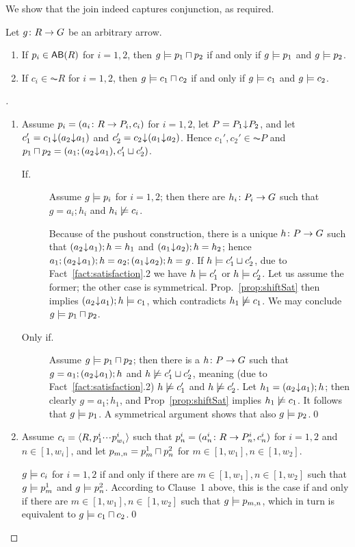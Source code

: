 We show that the join indeed captures conjunction, as required.
%
\begin{proposition}\label{prop:join} Let $g\colon R\rightarrow G$ be an arbitrary arrow.
\begin{enumerate}[defsep]
\item If $p_i\in \AB R$ for $i=1,2$, then $g\models p_1\sqcap p_2$ if and only if $g\models p_1$ and $g\models p_2$.

\item If $c_i\in \AC R$ for $i=1,2$, then $g\models c_1\sqcap c_2$ if and only if $g\models c_1$ and $g\models c_2$.
\end{enumerate}
\end{proposition}
%
\begin{proof}[]
\begin{enumerate}[defsep]
\item Assume $p_i=(a_i\colon R\rightarrow P_i,c_i)$ for $i=1,2$, let $P=P_1{\mskip1mu\downarrow\mskip1mu} P_2$, and let $c_1'={c_1}{\mskip1mu\downarrow\mskip1mu}{(a_2{\mskip1mu\downarrow\mskip1mu} a_1)}$ and $c_2'={c_2}{\mskip1mu\downarrow\mskip1mu}{(a_1{\mskip1mu\downarrow\mskip1mu} a_2)}$. Hence $c_1',c_2'\in \AC P$ and $p_1\sqcap p_2=(a_1;(a_2{\mskip1mu\downarrow\mskip1mu} a_1),c_1'\sqcup c_2')$.

\begin{description}
\item[If.] Assume $g\models p_i$ for $i=1,2$; then there are $h_i\colon P_i\rightarrow G$ such that $g=a_i;h_i$ and $h_i\not\models c_i$.
 
Because of the pushout construction, there is a unique $h\colon P\rightarrow G$ such that $(a_2{\mskip1mu\downarrow\mskip1mu} a_1);h=h_1$ and $(a_1{\mskip1mu\downarrow\mskip1mu} a_2);h=h_2$; hence $a_1;(a_2{\mskip1mu\downarrow\mskip1mu} a_1);h=a_2;(a_1{\mskip1mu\downarrow\mskip1mu} a_2);h=g$. If $h\models c_1'\sqcup c_2'$, due to Fact~\ref{fact:satisfaction}.2 we have $h\models c_1'$ or $h\models c_2'$. Let us assume the former; the other case is symmetrical. Prop.~\ref{prop:shiftSat} then implies $(a_2{\mskip1mu\downarrow\mskip1mu} a_1);h\models c_1$, which contradicts $h_1\not\models c_1$. We may conclude $g\models p_1\sqcap p_2$.

\item[Only if.] Assume $g\models p_1\sqcap p_2$; then there is a $h\colon P\rightarrow G$ such that $g=a_1;(a_2{\mskip1mu\downarrow\mskip1mu} a_1);h$ and $h\not\models c_1'\sqcup c_2'$, meaning (due to Fact~\ref{fact:satisfaction}.2) $h\not\models c_1'$ and $h\not\models c_2'$. Let $h_1=(a_2{\mskip1mu\downarrow\mskip1mu} a_1);h$; then clearly $g=a_1;h_1$, and Prop~\ref{prop:shiftSat} implies $h_1\not\models c_1$. It follows that $g\models p_1$. A symmetrical argument shows that also $g\models p_2$.\qed
\end{description}

\item Assume $c_i=\langle{R,p^i_1{\cdotp\mkern-2mu\cdotp\mkern-2mu\cdotp\mkern1mu}p^i_{w_i}}\rangle$ such that $p^i_n=(a^i_n\colon R\rightarrow P^i_n,c^i_n)$ for $i=1,2$ and $n\in[1,w_i]$, and let $p_{m,n}=p^1_m\sqcap p^2_n$ for $m\in[1,w_1],n\in [1,w_2]$.

$g\models c_i$ for $i=1,2$ if and only if there are $m\in[1,w_1], n\in[1,w_2]$ such that $g\models p^1_m$ and $g\models p^2_n$. According to Clause~1 above, this is the case if and only if there are $m\in[1,w_1], n\in[1,w_2]$ such that $g\models p_{m,n}$, which in turn is equivalent to $g\models c_1\sqcap c_2$.\qed
\end{enumerate}
\end{proof}
